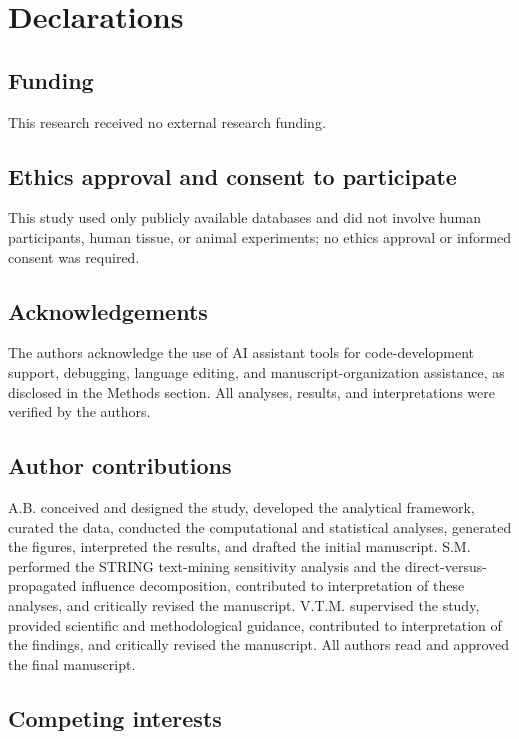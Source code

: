 \section*{Declarations}

\subsection*{Funding}

This research received no external research funding.

\subsection*{Ethics approval and consent to participate}

This study used only publicly available databases and did not involve human participants, human tissue, or animal experiments; no ethics approval or informed consent was required.

\subsection*{Acknowledgements}

The authors acknowledge the use of AI assistant tools for code-development support, debugging, language editing, and manuscript-organization assistance, as disclosed in the Methods section. All analyses, results, and interpretations were verified by the authors.

\subsection*{Author contributions}

A.B. conceived and designed the study, developed the analytical framework, curated the data, conducted the computational and statistical analyses, generated the figures, interpreted the results, and drafted the initial manuscript. S.M. performed the STRING text-mining sensitivity analysis and the direct-versus-propagated influence decomposition, contributed to interpretation of these analyses, and critically revised the manuscript. V.T.M. supervised the study, provided scientific and methodological guidance, contributed to interpretation of the findings, and critically revised the manuscript. All authors read and approved the final manuscript.

\subsection*{Competing interests}

